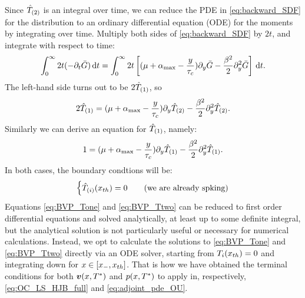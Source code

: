 Since ${ \hat{T}_{(2)} }$ is an integral over time, we can reduce the PDE in
\cref{eq:backward_SDF} for the distribution to an ordinary differential equation
(ODE) for the moments by integrating over time. Multiply both sides of
\cref{eq:backward_SDF} by $2t$, and integrate with respect to time:
\begin{equation}
\int_0^\infty 2t (-{\partial}_t { \bar{G} }) \, \mathrm{d} t
=
\int_0^\infty  2t \left[ ({\mu } + { \alpha_{\textrm{max}} } - \frac y{\tau_c}) {\partial}_y{ \bar{G} } - \frac {\beta^2} 2
{\partial}_y^2 { \bar{G} }\right]
\, \mathrm{d} t.
\end{equation}
The left-hand side turns out to be $2{ \hat{T}_{(1)} }$, so
\begin{equation}  
2{ \hat{T}_{(1)} }
=({\mu } + { \alpha_{\textrm{max}} } - \frac y{\tau_c})   {\partial}_y { \hat{T}_{(2)} }
- \frac {\beta^2} 2
{\partial}_y^2 { \hat{T}_{(2)} }.
\label{eq:BVP_Ttwo}
\end{equation}
Similarly we can derive an equation for ${ \hat{T}_{(1)} }$, namely:
\begin{equation}
1
=({\mu } + { \alpha_{\textrm{max}} } - \frac y{\tau_c})   {\partial}_y { \hat{T}_{(1)} }
- \frac {\beta^2} 2
{\partial}_y^2 { \hat{T}_{(1)} }.
\label{eq:BVP_Tone}
\end{equation}
In both cases, the boundary condtions will be:
\begin{equation}
\begin{cases}
{ \hat{T}_{(i)} }({ x_{th} }) = 0 & \quad (\textrm{we are already spking})
\end{cases}
\label{eq:BVP_Ti_BCs}
\end{equation}
Equations \ref{eq:BVP_Tone} and \ref{eq:BVP_Ttwo} can be reduced to first order
differential equations and solved analytically, at least up to some definite integral,
but the analytical solution is not particularly useful or necessary for
numerical calculations. Instead, we opt to calculate the solutions to
\ref{eq:BVP_Tone} and \ref{eq:BVP_Ttwo} directly via an ODE solver, starting
from $T_i({ x_{th} }) = 0$ and integrating down for $x  \in [{ x_{-} }, { x_{th} }]$.
That is how we have obtained the terminal conditions for both ${ \boldsymbol{v} }(x,{ T^* })$ and
$p(x,{ T^* })$ to apply in, respectively, \cref{eq:OC_LS_HJB_full} and
\cref{eq:adjoint_pde_OU}.


